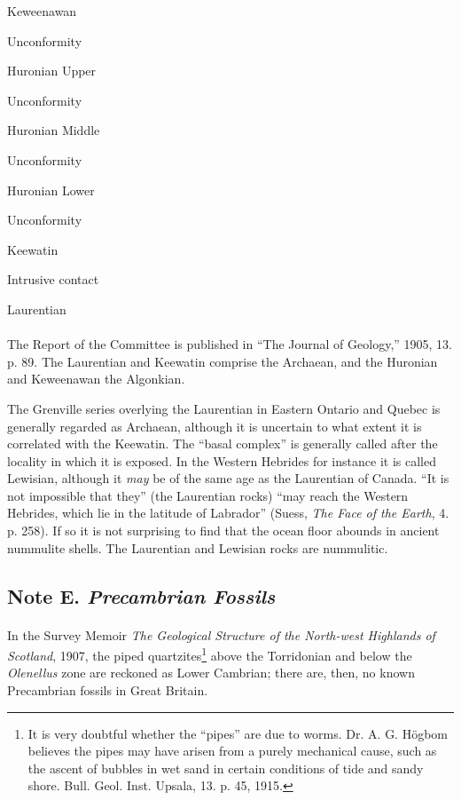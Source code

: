 \documentclass[a4paper, 12pt, oneside]{article}
\begin{document}
Keweenawan

\hspace{10mm}Unconformity

Huronian Upper

\hspace{10mm}Unconformity

Huronian Middle

\hspace{10mm}Unconformity

Huronian Lower

\hspace{10mm}Unconformity

Keewatin

\hspace{10mm}Intrusive contact

Laurentian

\paragraph{}
The Report of the Committee is published in ``The Journal of Geology,'' 1905, 13. p. 89. The Laurentian and Keewatin comprise the Archaean, and the Huronian and Keweenawan the Algonkian.

The Grenville series overlying the Laurentian in Eastern Ontario and Quebec is generally regarded as Archaean, although it is uncertain to what extent it is correlated with the Keewatin. The ``basal complex'' is generally called after the locality in which it is exposed. In the Western Hebrides for instance it is called Lewisian, although it \emph{may} be of the same age as the Laurentian of Canada. ``It is not impossible that they'' (the Laurentian rocks) ``may reach the Western Hebrides, which lie in the latitude of Labrador'' (Suess, \emph{The Face of the Earth}, 4. p. 258). If so it is not surprising to find that the ocean floor abounds in ancient nummulite shells. The Laurentian and Lewisian rocks are nummulitic.

\subsection{Note E. \emph{Precambrian Fossils}}
\paragraph{}
In the Survey Memoir \emph{The Geological Structure of the North-west Highlands of Scotland}, 1907, the piped quartzites\footnote{It is very doubtful whether the ``pipes'' are due to worms. Dr. A. G. Högbom believes the pipes may have arisen from a purely mechanical cause, such as the ascent of bubbles in wet sand in certain conditions of tide and sandy shore. Bull. Geol. Inst. Upsala, 13. p. 45, 1915.} above the Torridonian and below the \emph{Olenellus} zone are reckoned as Lower Cambrian; there are, then, no known Precambrian fossils in Great Britain.
\end{document}
